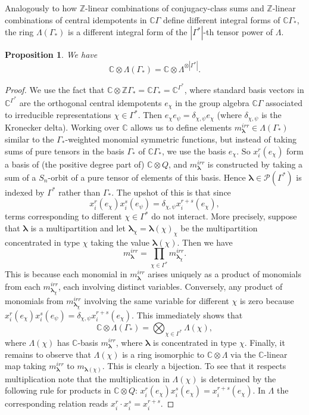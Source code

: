 \documentclass[10pt]{article}
\newtheorem{proposition}[theorem]{Proposition}
\theoremstyle{definition}
\newcommand{\bs}{\boldsymbol}
\newcommand{\LambdaG}{\Lambda(\Gamma_*)}
\begin{document}
Analogously to how $\mathbb{Z}$-linear combinations of conjugacy-class sums and $\mathbb{Z}$-linear combinations of central idempotents in $\mathbb{C}\Gamma$ define different integral forms of $\mathbb{C}\Gamma_*$, the ring $\LambdaG$ is a different integral form of the $|\Gamma^*|$-th tensor power of $\Lambda$.
\begin{proposition} \label{complex_bas_change_prop}
We have
\[
\mathbb{C} \otimes \LambdaG = \mathbb{C} \otimes \Lambda^{\otimes |\Gamma^*|}.
\]
\end{proposition}
\begin{proof}
We use the fact that $\mathbb{C} \otimes \mathbb{Z}\Gamma_* = \mathbb{C} \Gamma_* = \mathbb{C}^{\Gamma^*}$, where standard basis vectors in $\mathbb{C}^{\Gamma^*}$ are the orthogonal central idempotents $e_\chi$ in the group algebra $\mathbb{C}\Gamma$ associated to irreducible representations $\chi \in \Gamma^*$. Then $e_\chi e_{\psi} = \delta_{\chi, \psi} e_{\chi}$ (where $\delta_{\chi, \psi}$ is the Kronecker delta). Working over $\mathbb{C}$ allows us to define elements $m_{\bs\lambda}^{irr} \in \LambdaG$ similar to the $\Gamma_*$-weighted monomial symmetric functions, but instead of taking sums of pure tensors in the basis $\Gamma_*$ of $\mathbb{C}\Gamma_*$, we use the basis $e_\chi$. So $x_i^r (e_\chi)$ form a basis of (the positive degree part of) $\mathbb{C} \otimes Q$, and $m_{\bs\lambda}^{irr}$ is constructed by taking a sum of a $S_n$-orbit of a pure tensor of elements of this basis. Hence $\bs\lambda \in \mathcal{P}(\Gamma^*)$ is indexed by $\Gamma^*$ rather than $\Gamma_*$. The upshot of this is that since 
\[
x_i^r(e_\chi) x_i^s( e_\psi) = \delta_{\chi, \psi} x_i^{r+s}(e_\chi),
\]
terms corresponding to different $\chi \in \Gamma^*$ do not interact. More precisely, suppose that $\bs \lambda$ is a multipartition and let ${\bs \lambda}_\chi = {\bs \lambda}(\chi)_{\chi}$ be the multipartition concentrated in type $\chi$ taking the value $\bs \lambda(\chi)$. Then we have
\[
m_{\bs\lambda}^{irr} = \prod_{\chi \in \Gamma^*} m_{{\bs\lambda}_\chi}^{irr}.
\]
This is because each monomial in $m_{\bs\lambda}^{irr}$ arises uniquely as a product of monomials from each $m_{{\bs\lambda}_\chi}^{irr}$, each involving distinct variables. Conversely, any product of monomials from $m_{{\bs\lambda}_\chi}^{irr}$ involving the same variable for different $\chi$ is zero because $x_i^r(e_\chi) x_i^s( e_\psi) = \delta_{\chi, \psi} x_i^{r+s}(e_\chi)$. This immediately shows that
\[
\mathbb{C} \otimes \LambdaG = \bigotimes_{\chi \in \Gamma^*} \Lambda(\chi),
\]
where $\Lambda(\chi)$ has $\mathbb{C}$-basis $m_{\bs \lambda}^{irr}$, where $\bs\lambda$ is concentrated in type $\chi$. Finally, it remains to observe that $\Lambda(\chi)$ is a ring isomorphic to $\mathbb{C} \otimes \Lambda$ via the $\mathbb{C}$-linear map taking $m_{\bs\lambda}^{irr}$ to $m_{\bs\lambda(\chi)}$. This is clearly a bijection. To see that it respects multiplication note that the multiplication in $\Lambda(\chi)$ is determined by the following rule for products in $\mathbb{C} \otimes Q$: $x_i^r(e_\chi) x_i^s( e_\chi) = x_i^{r+s}(e_\chi)$. In $\Lambda$ the corresponding relation reads $x_i^r \cdot x_i^s = x_i^{r+s}$.
\end{proof}
\end{document}

